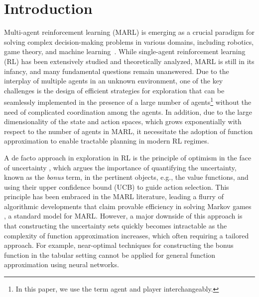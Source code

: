 
\section{Introduction}

Multi-agent reinforcement learning (MARL) is emerging as a crucial paradigm for solving complex decision-making problems in various domains, including robotics, game theory, and machine learning~\citep{busoniu2008comprehensive}. While single-agent reinforcement learning (RL) has been extensively studied and theoretically analyzed, MARL is still in its infancy, and many fundamental questions remain unanswered. Due to the interplay of multiple agents in an unknown environment, one of the key challenges is the design of efficient strategies for exploration that can be seamlessly implemented in the presence of a large number of agents\footnote{In this paper, we use the term agent and player interchangeably.} without the need of complicated coordination among the agents. In addition, due to the large dimensionality of the state and action spaces, which grows exponentially with respect to the number of agents in MARL, it necessitate the adoption of function approximation to enable tractable planning in modern RL regimes.

A de facto approach in exploration in RL is the principle of optimism in the face of uncertainty \citep{lai1987adaptive}, which argues the importance of quantifying the uncertainty, known as the {\em bonus} term, in the pertinent objects, e.g., the value functions, and using their upper confidence bound (UCB) to guide action selection. This principle has been embraced in the MARL literature, leading a flurry of algorithmic developments \citep{liu2021sharp,bai2021sample,song2021can,jin2021v,li2022minimax,ni2022representation,cui2023breaking,wang2023breaking,dai2024refined} that claim provable efficiency in solving Markov games \citep{littman1994markov}, a standard model for MARL. However, a major downside of this approach is that constructing the uncertainty sets quickly becomes intractable as the complexity of function approximation increases, which often requiring a tailored approach. For example, near-optimal techniques for constructing the bonus function in the tabular setting cannot be applied for general function approximation using neural networks.

 
    
